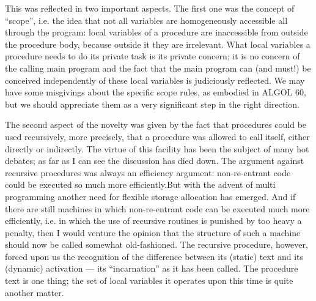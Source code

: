 This was reflected in two important aspects. The first one was the concept of ``scope'', i.e. the idea that not all variables are homogeneously accessible all through the program: local variables of a procedure are inaccessible from  outside the procedure body, because outside it they are irrelevant. What local variables a procedure needs to do its private task is its private concern; it is no concern of the calling main program and the fact that the main program can (and must!) be conceived independently of these local variables is judiciously reflected. We may have some misgivings about the specific scope rules, as embodied in ALGOL 60, but we should appreciate them as a very significant step in the right direction.

The second aspect of the novelty was given by the fact that procedures could be used recursively, more precisely, that a procedure was allowed to call itself, either directly or indirectly. The virtue of this facility has been the subject of many hot debates; as far as I can see the discussion has died down. The argument against recursive procedures was always an efficiency argument: non-re-entrant code could be executed so much more efficiently.But with the advent of multi programming another need for flexible storage allocation has emerged. And if there are still machines in which non-re-entrant code can be executed much more efficiently, i.e. in which the use of recursive routines is punished by too heavy a penalty, then I would venture the opinion that the structure of such a machine should now be called somewhat old-fashioned. The recursive procedure, however, forced upon us the recognition of the difference between its (static) text and its (dynamic) activation --- its ``incarnation'' as it has been called. The procedure text is one thing; the set of local variables it operates upon this time is quite another matter.

